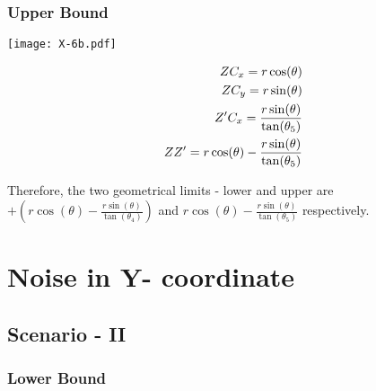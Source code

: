\subsubsection{Upper Bound}

\begin{minipage}[t]{0.5\textwidth}
\texttt{[image: X-6b.pdf]} 
\end{minipage}
\begin{minipage}[t]{0.5\textwidth}
\vspace{-2in}
\begin{equation*}
\centering
\begin{aligned}
ZC_x = r\cos(\theta) \\
ZC_y = r\sin(\theta) \\
Z'C_x = \frac{r\sin(\theta)}{\tan(\theta_5)}\\
ZZ' = r\cos(\theta) - \frac{r\sin(\theta)}{\tan(\theta_5)}
\end{aligned}
\end{equation*}
\end{minipage}


Therefore, the two geometrical limits - lower and upper are $+(r\cos(\theta) - \frac{r\sin(\theta)}{\tan(\theta_4)})$ and $r\cos(\theta) - \frac{r\sin(\theta)}{\tan(\theta_5)}$ respectively.


\section{Noise in Y- coordinate}

\subsection{Scenario - II}

\subsubsection{Lower Bound}


